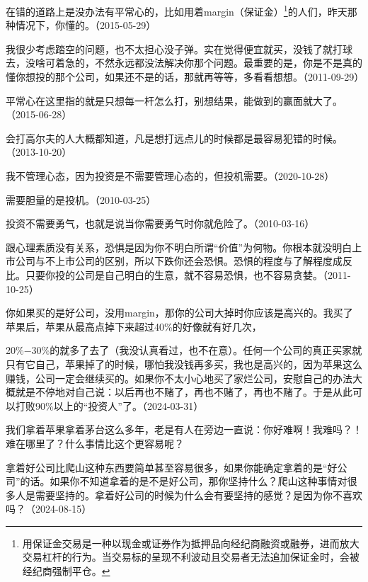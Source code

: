 在错的道路上是没办法有平常心的，比如用着margin（保证金）\footnote{用保证金交易是一种以现金或证券作为抵押品向经纪商融资或融券，进而放大交易杠杆的行为。当交易标的呈现不利波动且交易者无法追加保证金时，会被经纪商强制平仓。}的人们，昨天那种情况下，你懂的。（2015-05-29）


我很少考虑踏空的问题，也不太担心没子弹。实在觉得便宜就买，没钱了就打球去，没啥可着急的，不然永远都没法解决你那个问题。最重要的是，你是不是真的懂你想投的那个公司，如果还不是的话，那就再等等，多看看想想。（2011-09-29）


平常心在这里指的就是只想每一杆怎么打，别想结果，能做到的赢面就大了。（2015-06-28）

会打高尔夫的人大概都知道，凡是想打远点儿的时候都是最容易犯错的时候。（2013-10-20）


我不管理心态，因为投资是不需要管理心态的，但投机需要。（2020-10-28）

需要胆量的是投机。（2010-03-25）

投资不需要勇气，也就是说当你需要勇气时你就危险了。（2010-03-16）


跟心理素质没有关系，恐惧是因为你不明白所谓“价值”为何物。你根本就没明白上市公司与不上市公司的区别，所以下跌你还会恐惧。恐惧的程度与了解程度成反比。只要你投的公司是自己明白的生意，就不容易恐惧，也不容易贪婪。（2011-10-25）


你如果买的是好公司，没用margin，那你的公司大掉时你应该是高兴的。我买了苹果后，苹果从最高点掉下来超过40\%的好像就有好几次，

20\%\( - \)30\%的就多了去了（我没认真看过，也不在意）。任何一个公司的真正买家就只有它自己，苹果掉了的时候，哪怕我没钱再多买，我也是高兴的，因为苹果这么赚钱，公司一定会继续买的。如果你不太小心地买了家烂公司，安慰自己的办法大概就是不停地对自己说：以后再也不赌了，再也不赌了，再也不赌了。于是从此可以打败90\%以上的“投资人”了。（2024-03-31）

我们拿着苹果拿着茅台这么多年，老是有人在旁边一直说：你好难啊！我难吗？！难在哪里了？什么事情比这个更容易呢？

拿着好公司比爬山这种东西要简单甚至容易很多，如果你能确定拿着的是“好公司”的话。如果你不知道拿着的是不是好公司，那你坚持什么？爬山这种事情对很多人是需要坚持的。拿着好公司的时候为什么会有要坚持的感觉？是因为你不喜欢吗？（2024-08-15）
